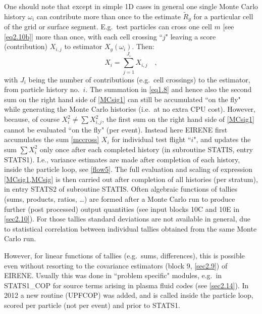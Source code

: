 One should note that except in simple 1D cases in general one single Monte
Carlo history $\omega_i$ can contribute more than once to the estimate $\tilde
  R_g$ for a particular cell of the grid or surface segment.
E.g.\ test particles can cross one cell $m$ [see \cref{eq2.10b}] more than
once, with each cell crossing ``$j$" leaving a score (contribution) $X_{i,j}$
to estimator $X_g(\omega_i)$.
Then:
\begin{equation}
  \label{mccross}
  X_i=\sum_{j=1}^{J_i} X_{i,j} \quad,
\end{equation}
with $J_i$ being the number
of contributions  (e.g.\ cell crossings) to the estimator, from particle
history no.\ $i$.
The summation in \cref{eq1.8} and hence also the second sum on the right hand
side of  \cref{MCsig1} can still be accumulated ``on the fly" while generating
the Monte Carlo histories (i.e.\ at no extra CPU cost).
However, because, of course  $X_i^2 \neq  \sum X_{i,j}^2$, the first sum on the
right hand side of \cref{MCsig1} cannot be evaluated ``on the fly" (per event).
Instead here EIRENE first accumulates the sum \cref{mccross} $X_i$ for
individual test flight ``$i$", and updates the sum $\sum X_i^2$ only once after
each completed history (in subroutine STATIS, entry STATS1).
I.e., variance estimates are made after completion of each history, inside the
particle loop, see \cref{flow5}.
The full evaluation and scaling of expression \cref{MCsig1,MCsig} is then
carried out after completion of all histories (per stratum), in entry STATS2 of
subroutine STATIS.
\label{lin-funct}
Often algebraic functions of tallies (sums, products, ratios, \dots) are formed
after a Monte Carlo run to produce further (post processed) output quantities
(see input blocks 10C and 10E in \cref{sec2.10}).
For those tallies standard deviations are not available in general, due to
statistical correlation between individual tallies obtained from the same Monte
Carlo run.

However, for linear functions of tallies (e.g.\ sums, differences), this is
possible even without resorting to the covariance estimators (block 9,
\cref{sec2.9}) of EIRENE.
Usually this was done in ``problem specific" modules, e.g.\ in STATS1\_COP for
source terms arising in plasma fluid codes (see \cref{sec2.14}).
In 2012 a new routine (UPFCOP) was added, and is called inside the particle
loop, scored per particle (not per event) and prior to STATS1.

